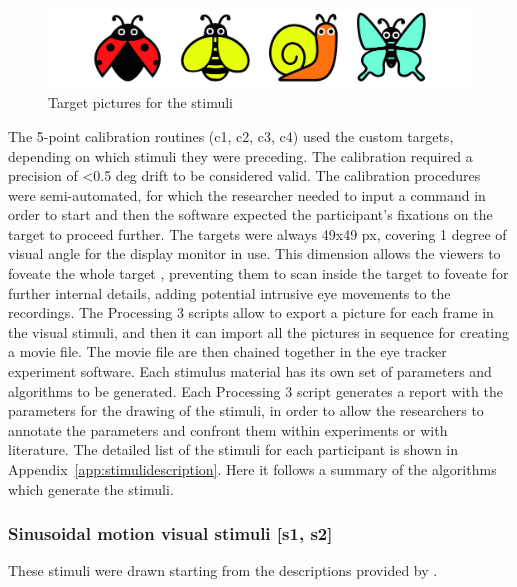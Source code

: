 \begin{figure}[h]
  \centering
  \includegraphics[width=.9\textwidth]{figures/targets-08.jpg}
  \caption[Target pictures for the stimuli]{Target pictures for the stimuli}
  \label{fig:stimulitargets}
\end{figure}

The 5-point calibration routines (c1, c2, c3, c4) used the custom targets, depending on which stimuli they were preceding. The calibration required a precision of \textless 0.5 deg drift to be considered valid. The calibration procedures were semi-automated, for which the researcher needed to input a command in order to start and then the software expected the participant’s fixations on the target to proceed further. The targets were always 49x49 px, covering 1 degree of visual angle for the display monitor in use. This dimension allows the viewers to foveate the whole target \citep[p. 2]{leigh2015neurology}, preventing them to scan inside the target to foveate for further internal details, adding potential intrusive eye movements to the recordings.
The Processing 3 scripts allow to export a picture for each frame in the visual stimuli, and then it can import all the pictures in sequence for creating a movie file. The movie file are then chained together in the eye tracker experiment software.
Each stimulus material has its own set of parameters and algorithms to be generated. Each Processing 3 script generates a report with the parameters for the drawing of the stimuli, in order to allow the researchers to annotate the parameters and confront them within experiments or with literature. The detailed list of the stimuli for each participant is shown in Appendix~\ref{app:stimulidescription}. Here it follows a summary of the algorithms which generate the stimuli.



\subsubsection{Sinusoidal motion visual stimuli [s1, s2]}
\label{sec:expsinestimuli}

These stimuli were drawn starting from the descriptions provided by \cite{vonhofsten1997smoothpursuit}.

